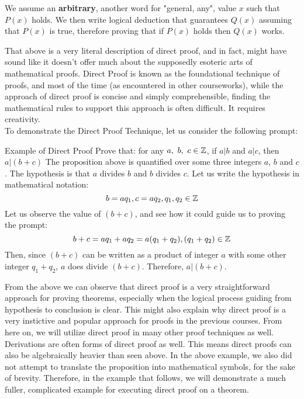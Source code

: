 We assume an \textbf{arbitrary}, another word for "general, any", value $x$ such that $P(x)$ holds. We then write logical deduction that guarantees $Q(x)$ assuming that $P(x)$ is true, therefore proving that if $P(x)$ holds then $Q(x)$ works.

That above is a very literal description of direct proof, and in fact, might have sound like it doesn't offer much about the supposedly esoteric arts of mathematical proofs. Direct Proof is known as the foundational technique of proofs, and most of the time (as encountered in other courseworks), while the approach of direct proof is concise and simply comprehensible, finding the mathematical rules to support this approach is often difficult. It requires creativity. \\
To demonstrate the Direct Proof Technique, let us consider the following prompt:
\begin{ln-think}{Example of Direct Proof}{}
    Prove that: for any $a,\ b,\ c \in \mathbb{Z}$, if $a|b$ and $a|c$, then $a|(b+c)$
    \tcblower
    The proposition above is quantified over some three integers $a$, $b$ and $c$. The hypothesis is that $a$ divides $b$ and $b$ divides $c$. Let us write the hypothesis in mathematical notation:
    \[b = a q_1, c = a q_2, q_1, q_2 \in \mathbb{Z}\]
    Let us observe the value of $(b+c)$, and see how it could guide us to proving the prompt:
    \[b + c = a q_1 + a q_2 = a(q_1 + q_2), (q_1 + q_2) \in \mathbb{Z}\]
    Then, since $(b + c)$ can be written as a product of integer $a$ with some other integer $q_1 + q_2$, $a$ does divide $(b + c)$. Therefore, $a|(b+c)$.
\end{ln-think}
From the above we can observe that direct proof is a very straightforward approach for proving theorems, especially when the logical process guiding from hypothesis to conclusion is clear. This might also explain why direct proof is a very instictive and popular approach for proofs in the previous courses. From here on, we will utilize direct proof in many other proof techniques as well. \\
Derivations are often forms of direct proof as well. This means direct proofs can also be algebraically heavier than seen above. In the above example, we also did not attempt to translate the proposition into mathematical symbols, for the sake of brevity. Therefore, in the example that follows, we will demonstrate a much fuller, complicated example for executing direct proof on a theorem.
